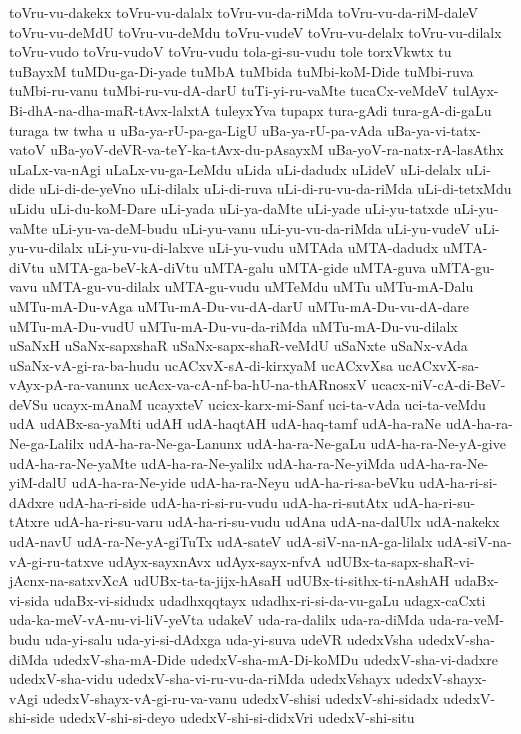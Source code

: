 {toVru-vu-dakekx
toVru-vu-dalalx
toVru-vu-da-riMda
toVru-vu-da-riM-daleV
toVru-vu-deMdU
toVru-vu-deMdu
toVru-vudeV
toVru-vu-delalx
toVru-vu-dilalx
toVru-vudo
toVru-vudoV
toVru-vudu
tola-gi-su-vudu
tole
torxVkwtx
tu
tuBayxM
tuMDu-ga-Di-yade
tuMbA
tuMbida
tuMbi-koM-Dide
tuMbi-ruva
tuMbi-ru-vanu
tuMbi-ru-vu-dA-darU
tuTi-yi-ru-vaMte
tucaCx-veMdeV
tulAyx-Bi-dhA-na-dha-maR-tAvx-lalxtA
tuleyxYva
tupapx
tura-gAdi
tura-gA-di-gaLu
turaga
tw
twha
u
uBa-ya-rU-pa-ga-LigU
uBa-ya-rU-pa-vAda
uBa-ya-vi-tatx-vatoV
uBa-yoV-deVR-va-teY-ka-tAvx-du-pAsayxM
uBa-yoV-ra-natx-rA-lasAthx
uLaLx-va-nAgi
uLaLx-vu-ga-LeMdu
uLida
uLi-dadudx
uLideV
uLi-delalx
uLi-dide
uLi-di-de-yeVno
uLi-dilalx
uLi-di-ruva
uLi-di-ru-vu-da-riMda
uLi-di-tetxMdu
uLidu
uLi-du-koM-Dare
uLi-yada
uLi-ya-daMte
uLi-yade
uLi-yu-tatxde
uLi-yu-vaMte
uLi-yu-va-deM-budu
uLi-yu-vanu
uLi-yu-vu-da-riMda
uLi-yu-vudeV
uLi-yu-vu-dilalx
uLi-yu-vu-di-lalxve
uLi-yu-vudu
uMTAda
uMTA-dadudx
uMTA-diVtu
uMTA-ga-beV-kA-diVtu
uMTA-galu
uMTA-gide
uMTA-guva
uMTA-gu-vavu
uMTA-gu-vu-dilalx
uMTA-gu-vudu
uMTeMdu
uMTu
uMTu-mA-Dalu
uMTu-mA-Du-vAga
uMTu-mA-Du-vu-dA-darU
uMTu-mA-Du-vu-dA-dare
uMTu-mA-Du-vudU
uMTu-mA-Du-vu-da-riMda
uMTu-mA-Du-vu-dilalx
uSaNxH
uSaNx-sapxshaR
uSaNx-sapx-shaR-veMdU
uSaNxte
uSaNx-vAda
uSaNx-vA-gi-ra-ba-hudu
ucACxvX-sA-di-kirxyaM
ucACxvXsa
ucACxvX-sa-vAyx-pA-ra-vanunx
ucAcx-va-cA-nf-ba-hU-na-thARnosxV
ucacx-niV-cA-di-BeV-deVSu
ucayx-mAnaM
ucayxteV
ucicx-karx-mi-Sanf
uci-ta-vAda
uci-ta-veMdu
udA
udABx-sa-yaMti
udAH
udA-haqtAH
udA-haq-tamf
udA-ha-raNe
udA-ha-ra-Ne-ga-Lalilx
udA-ha-ra-Ne-ga-Lanunx
udA-ha-ra-Ne-gaLu
udA-ha-ra-Ne-yA-give
udA-ha-ra-Ne-yaMte
udA-ha-ra-Ne-yalilx
udA-ha-ra-Ne-yiMda
udA-ha-ra-Ne-yiM-dalU
udA-ha-ra-Ne-yide
udA-ha-ra-Neyu
udA-ha-ri-sa-beVku
udA-ha-ri-si-dAdxre
udA-ha-ri-side
udA-ha-ri-si-ru-vudu
udA-ha-ri-sutAtx
udA-ha-ri-su-tAtxre
udA-ha-ri-su-varu
udA-ha-ri-su-vudu
udAna
udA-na-dalUlx
udA-nakekx
udA-navU
udA-ra-Ne-yA-giTuTx
udA-sateV
udA-siV-na-nA-ga-lilalx
udA-siV-na-vA-gi-ru-tatxve
udAyx-sayxnAvx
udAyx-sayx-nfvA
udUBx-ta-sapx-shaR-vi-jAcnx-na-satxvXcA
udUBx-ta-ta-jijx-hAsaH
udUBx-ti-sithx-ti-nAshAH
udaBx-vi-sida
udaBx-vi-sidudx
udadhxqqtayx
udadhx-ri-si-da-vu-gaLu
udagx-caCxti
uda-ka-meV-vA-nu-vi-liV-yeVta
udakeV
uda-ra-dalilx
uda-ra-diMda
uda-ra-veM-budu
uda-yi-salu
uda-yi-si-dAdxga
uda-yi-suva
udeVR
udedxVsha
udedxV-sha-diMda
udedxV-sha-mA-Dide
udedxV-sha-mA-Di-koMDu
udedxV-sha-vi-dadxre
udedxV-sha-vidu
udedxV-sha-vi-ru-vu-da-riMda
udedxVshayx
udedxV-shayx-vAgi
udedxV-shayx-vA-gi-ru-va-vanu
udedxV-shisi
udedxV-shi-sidadx
udedxV-shi-side
udedxV-shi-si-deyo
udedxV-shi-si-didxVri
udedxV-shi-situ
}

